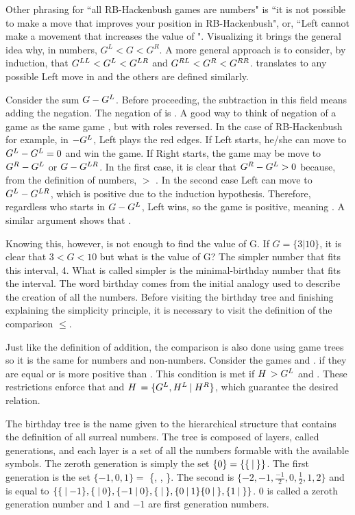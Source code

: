 Other phrasing for ``all RB-Hackenbush games are numbers" is ``it is not possible to make a move that improves your position in  RB-Hackenbush", or, ``Left cannot make a movement that increases the value of \Gm{}". Visualizing it brings the general idea why, in numbers, $G^L < G < G^R$. A more general approach is to consider, by induction, that $\mbox{$G^{LL}$} < \mbox{$G^L$} < \mbox{$G^{LR}$}$ and $\mbox{$G^{RL}$} < \mbox{$G^R$} < \mbox{$G^{RR}$}$.  translates to any possible Left move in  and the others are defined similarly.

Consider the sum $\mbox{$G$} - \mbox{$G^L$}$. Before proceeding, the subtraction in this field means adding the negation. The negation of  is . A good way to think of negation of a game \Gm{} as the same game \Gm{}, but with roles reversed. In the case of RB-Hackenbush for example, in ${-}\mbox{$G^L$}$, Left plays the red edges. If Left starts, he/she can move to $\mbox{$G^L$} - \mbox{$G^L$} = 0$ and win the game. If Right starts, the game may be move to $\mbox{$G^R$} - \mbox{$G^L$}$ or $\mbox{$G$} - \mbox{$G^{LR}$}$. In the first case, it is clear that $\mbox{$G^R$} - \mbox{$G^L$} > 0$ because, from the definition of numbers,  $>$ .
In the second case Left can move to $\mbox{$G^L$} - \mbox{$G^{LR}$}$, which is positive due to the induction hypothesis. Therefore, regardless who starts in $\mbox{$G$} - \mbox{$G^L$}$, Left wins, so the game is positive, meaning . A similar argument shows that .

Knowing this, however, is not enough to find the value of G. If $G = \{3 | 10\}$, it is clear that $3 < G < 10$ but what is the value of G? The simpler number that fits this interval, 4. What is called simpler is the minimal-birthday number that fits the interval. The word birthday comes from the initial analogy used to describe the creation of all the numbers. Before visiting the birthday tree and finishing explaining the simplicity principle, it is necessary to visit the definition of the comparison $\leq$.

Just like the definition of addition, the comparison is also done using game trees so it is the same for numbers and non-numbers. Consider the games \Gm{} and \Hm. \Gm{\leq \Hm} if they are equal or \Hm is more positive than \Gm{}. This condition is met if $\mbox{$H\,$} > G^L$ and . These restrictions enforce that  and $\mbox{$H\,$} = \mbox{$\{G^L,H^L\:|\:H^R\}$}$, which guarantee the desired relation.

The birthday tree is the name given to the hierarchical structure that contains the definition of all surreal numbers. The tree is composed of layers, called generations, and each layer is a set of all the numbers formable with the available symbols. The zeroth generation is simply the set $\{0\} = \{\mbox{$\{\:|\:\}$}\}$. The first generation is the set $\{{-}1,0,1\}=$ \{, \gam{}{}, \}. The second is $\{-2,-1,\frac{-1}{2},0,\frac{1}{2},1,2\}$ and is equal to $\{\mbox{$\{\:|\:{-}1\}$},\mbox{$\{\:|\:0\}$},\mbox{$\{{-}1\:|\:0\}$},\mbox{$\{\:|\:\}$},\mbox{$\{0\:|\:1\}$}\mbox{$\{0\:|\:\}$},\mbox{$\{1\:|\:\}$}\}$. $0$ is called a zeroth generation number and $1$ and ${-}1$ are first generation numbers.

